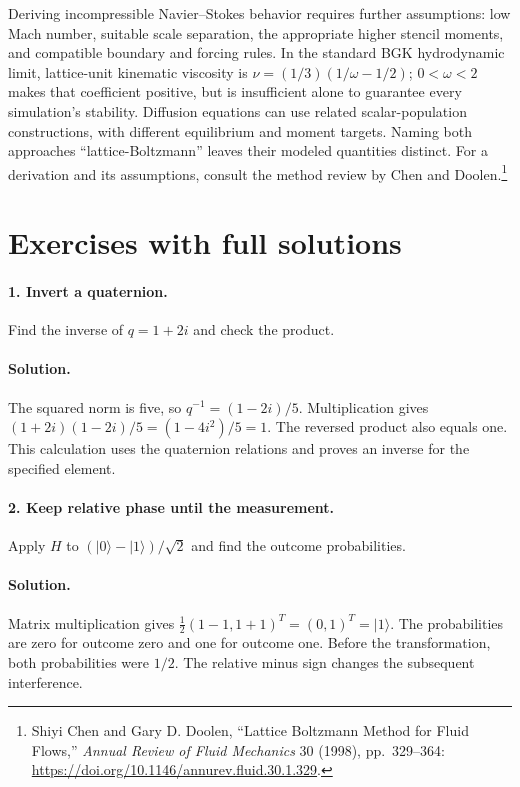 Deriving incompressible Navier--Stokes behavior requires further assumptions:
low Mach number, suitable scale separation, the appropriate higher stencil
moments, and compatible boundary and forcing rules. In the standard BGK
hydrodynamic limit, lattice-unit kinematic viscosity is
$\nu=(1/3)(1/\omega-1/2)$; $0<\omega<2$ makes that coefficient positive,
but is insufficient alone to guarantee every simulation's stability.
Diffusion equations can use related scalar-population constructions, with
different equilibrium and moment targets. Naming both approaches
``lattice-Boltzmann'' leaves their modeled quantities distinct.
For a derivation and its assumptions, consult the method review by Chen and
Doolen.\footnote{Shiyi Chen and Gary D. Doolen, ``Lattice Boltzmann Method
for Fluid Flows,'' \emph{Annual Review of Fluid Mechanics} 30 (1998),
pp.~329--364: \url{https://doi.org/10.1146/annurev.fluid.30.1.329}.}

\section{Exercises with full solutions}
\paragraph{1. Invert a quaternion.}
Find the inverse of $q=1+2i$ and check the product.

\paragraph{Solution.}
The squared norm is five, so $q^{-1}=(1-2i)/5$.
Multiplication gives $(1+2i)(1-2i)/5=(1-4i^2)/5=1$.
The reversed product also equals one. This calculation uses the quaternion
relations and proves an inverse for the specified element.

\paragraph{2. Keep relative phase until the measurement.}
Apply $H$ to $(|0\rangle-|1\rangle)/\sqrt2$ and find the outcome probabilities.

\paragraph{Solution.}
Matrix multiplication gives
$\frac12(1-1,1+1)^T=(0,1)^T=|1\rangle$.
The probabilities are zero for outcome zero and one for outcome one.
Before the transformation, both probabilities were $1/2$. The relative
minus sign changes the subsequent interference.

